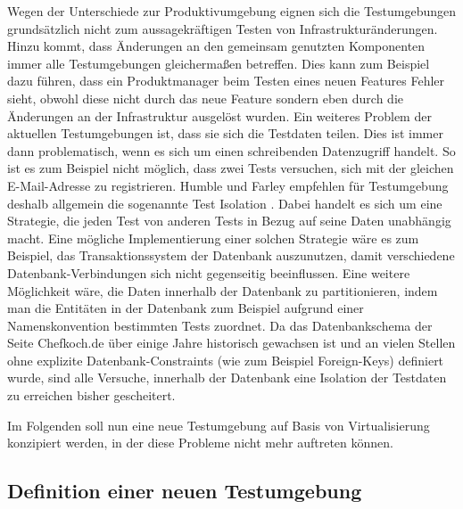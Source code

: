 Wegen der Unterschiede zur Produktivumgebung eignen sich die Testumgebungen grundsätzlich nicht zum aussagekräftigen Testen von Infrastrukturänderungen. Hinzu kommt, dass Änderungen an den gemeinsam genutzten Komponenten immer alle Testumgebungen gleichermaßen betreffen. Dies kann zum Beispiel dazu führen, dass ein Produktmanager beim Testen eines neuen Features Fehler sieht, obwohl diese nicht durch das neue Feature sondern eben durch die Änderungen an der Infrastruktur ausgelöst wurden. Ein weiteres Problem der aktuellen Testumgebungen ist, dass sie sich die Testdaten teilen. Dies ist immer dann problematisch, wenn es sich um einen schreibenden Datenzugriff handelt. So ist es zum Beispiel nicht möglich, dass zwei Tests versuchen, sich mit der gleichen E-Mail-Adresse zu registrieren. Humble und Farley empfehlen für Testumgebung deshalb allgemein die sogenannte Test Isolation \citep[Vgl.][S. 337]{HumFar10}. Dabei handelt es sich um eine Strategie, die jeden Test von anderen Tests in Bezug auf seine Daten unabhängig macht. Eine mögliche Implementierung einer solchen Strategie wäre es zum Beispiel, das Transaktionssystem der Datenbank auszunutzen, damit verschiedene Datenbank-Verbindungen sich nicht gegenseitig beeinflussen. Eine weitere Möglichkeit wäre, die Daten innerhalb der Datenbank zu partitionieren, indem man die Entitäten in der Datenbank zum Beispiel aufgrund einer Namenskonvention bestimmten Tests zuordnet. Da das Datenbankschema der Seite Chefkoch.de über einige Jahre historisch gewachsen ist und an vielen Stellen ohne explizite Datenbank-Constraints (wie zum Beispiel Foreign-Keys) definiert wurde, sind alle Versuche, innerhalb der Datenbank eine Isolation der Testdaten zu erreichen bisher gescheitert.

Im Folgenden soll nun eine neue Testumgebung auf Basis von Virtualisierung konzipiert werden, in der diese Probleme nicht mehr auftreten können.

\subsection{Definition einer neuen Testumgebung}

